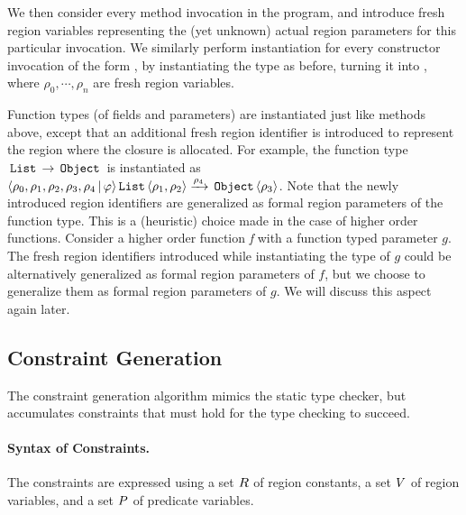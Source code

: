 
We then consider every method invocation in the program, and introduce
fresh region variables representing the (yet unknown) actual region
parameters for this particular invocation.
%
We similarly perform instantiation for every constructor invocation
of the form , by instantiating the type  as
before, turning it into ,
where $\rho_0, \cdots, \rho_n$ are fresh region variables.

Function types (of fields and parameters) are instantiated just like methods above, except that
an additional fresh region identifier is introduced to represent the region where the closure is
allocated.
For example, the function type $\,{\tt List}\, \rightarrow \,{\tt Object}\,$ is instantiated as
$\langle \rho_0, \rho_1, \rho_2, \rho_3, \rho_4 \,|\, \varphi  \rangle \,{\tt List}\, \langle \rho_1,\rho_2 \rangle \xrightarrow{\rho_4} \,{\tt Object}\,\langle \rho_3 \rangle$.
Note that the newly introduced region identifiers are generalized as formal region parameters of the function type.
This is a (heuristic) choice made in the case of higher order functions.
Consider a higher order function \emph{f} with a function typed parameter $g$.
The fresh region identifiers introduced while instantiating the type of $g$ could be
alternatively generalized as formal region parameters of $f$, but we choose to
generalize them as formal region parameters of $g$.
We will discuss this aspect again later.

\subsection{Constraint Generation}
\label{sec:fb-constraintsem}

The constraint generation algorithm mimics the static type checker, but accumulates
constraints that must hold for the type checking to succeed.

\paragraph{Syntax of Constraints.}
The constraints are expressed using
a set $R$ of region constants,
a set $V$ of region variables,
and
a set $P$ of predicate variables.
% 

